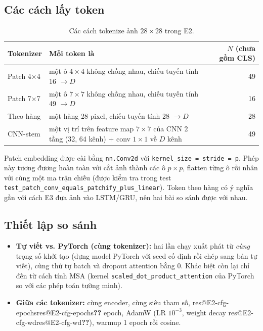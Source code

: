 \documentclass[twoside,final]{hcmut-report}
\makeatletter
\newcommand{\res}[1]{\ifcsname res@#1\endcsname\csname res@#1\endcsname\else\textbf{??}\fi}
\makeatother
\begin{document}
\subsection{Các cách lấy token}
\begin{table}[H]
\centering\small
\begin{tabular}{lp{8.6cm}r}
\toprule
Tokenizer & Mỗi token là & $N$ (chưa gồm CLS) \\
\midrule
Patch 4$\times$4 & một ô $4\times4$ không chồng nhau, chiếu tuyến tính 16 $\rightarrow D$ & 49 \\
Patch 7$\times$7 & một ô $7\times7$ không chồng nhau, chiếu tuyến tính 49 $\rightarrow D$ & 16 \\
Theo hàng & một hàng 28 pixel, chiếu tuyến tính 28 $\rightarrow D$ & 28 \\
CNN-stem & một vị trí trên feature map $7\times7$ của CNN 2 tầng (32, 64 kênh) + conv $1\times1$ về $D$ kênh & 49 \\
\bottomrule
\end{tabular}
\caption{Các cách tokenize ảnh $28\times28$ trong E2.}
\end{table}

Patch embedding được cài bằng \texttt{nn.Conv2d} với \texttt{kernel\_size = stride = p}. Phép này tương
đương hoàn toàn với cắt ảnh thành các ô $p\times p$, flatten từng ô rồi nhân với cùng một ma trận chiếu
(được kiểm tra trong test \texttt{test\_patch\_conv\_equals\_patchify\_plus\_linear}).
Token theo hàng có ý nghĩa gần với cách E3 đưa ảnh vào LSTM/GRU, nên hai bài so sánh được với nhau.

\subsection{Thiết lập so sánh}
\begin{itemize}
  \item \textbf{Tự viết vs. PyTorch (cùng tokenizer):} hai lần chạy xuất phát từ \emph{cùng} trọng số khởi tạo (dựng model PyTorch với seed cố định rồi chép sang bản tự viết), cùng thứ tự batch và dropout attention bằng 0. Khác biệt còn lại chỉ đến từ cách tính MSA (kernel \texttt{scaled\_dot\_product\_attention} của
        PyTorch so với các phép toán tường minh).
  \item \textbf{Giữa các tokenizer:} cùng encoder, cùng siêu tham số, \res{E2-cfg-epochs} epoch, AdamW
        (LR $10^{-3}$, weight decay \res{E2-cfg-wd}), warmup 1 epoch rồi cosine.
\end{itemize}
\end{document}
